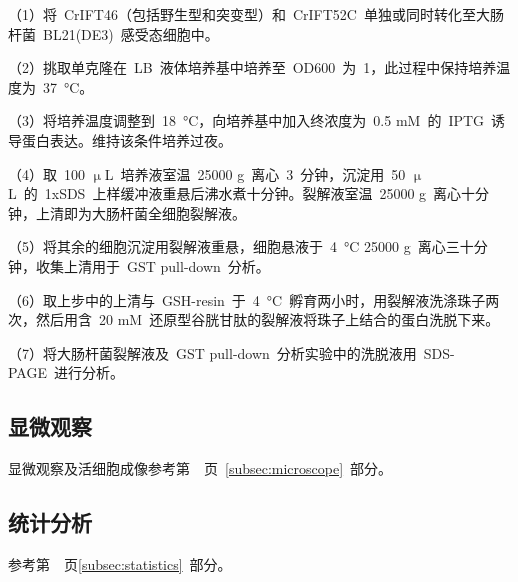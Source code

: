 （1）将\ CrIFT46（包括野生型和突变型）和\ CrIFT52C\ 单独或同时转化至大肠杆菌\ BL21(DE3)\ 感受态细胞中。

（2）挑取单克隆在\ LB\ 液体培养基中培养至\ OD600\ 为\ 1，此过程中保持培养温度为\
\SI{37}{\degreeCelsius}。

（3）将培养温度调整到\ \SI{18}{\degreeCelsius}，向培养基中加入终浓度为\ 0.5 mM\ 的\ IPTG\ 诱导蛋白表达。维持该条件培养过夜。

（4）取\ 100 $\upmu$L\ 培养液室温\ 25000 g\ 离心\ 3\ 分钟，沉淀用\ 50 $\upmu$L\ 的\ 1xSDS\ 上样缓冲液重悬后沸水煮十分钟。裂解液室温\ 25000 g\ 离心十分钟，上清即为大肠杆菌全细胞裂解液。

（5）将其余的细胞沉淀用裂解液重悬，细胞悬液于\ \SI{4}{\degreeCelsius} 25000 g\ 离心三十分钟，收集上清用于\ GST pull-down\ 分析。

（6）取上步中的上清与\ GSH-resin\ 于\ \SI{4}{\degreeCelsius}\ 孵育两小时，用裂解液洗涤珠子两次，然后用含\ 20 mM\ 还原型谷胱甘肽的裂解液将珠子上结合的蛋白洗脱下来。

（7）将大肠杆菌裂解液及\ GST pull-down\ 分析实验中的洗脱液用\ SDS-PAGE\ 进行分析。

\subsection{显微观察}
显微观察及活细胞成像参考第\ \pageref{subsec:microscope}\ 页\ \ref{subsec:microscope}\ 部分。

\subsection{统计分析}
参考第\ \pageref{subsec:statistics}\ 页\ref{subsec:statistics}\ 部分。

